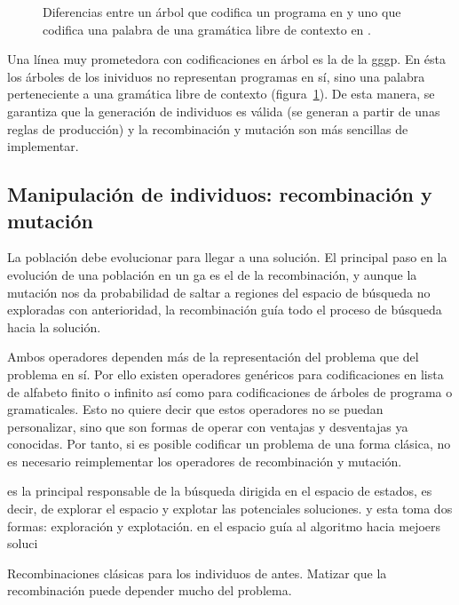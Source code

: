\begin{figure}
	\caption{Diferencias entre un árbol que codifica un programa en  y uno que codifica una palabra de una gramática libre de contexto en .}
	\label{fig:gp-vs-gggp}
\end{figure}

Una línea muy prometedora con codificaciones en árbol es la de la \gls{gggp}. En ésta los árboles de los inividuos no representan programas en sí, sino una palabra perteneciente a una gramática libre de contexto (figura~\ref{fig:gp-vs-gggp}). De esta manera, se garantiza que la generación de individuos es válida (se generan a partir de unas reglas de producción) y la recombinación y mutación son más sencillas de implementar.

\subsection{Manipulación de individuos: recombinación y mutación}

La población debe evolucionar para llegar a una solución. El principal paso en la evolución de una población en un \gls{ga} es el de la recombinación, y aunque la mutación nos da probabilidad de saltar a regiones del espacio de búsqueda no exploradas con anterioridad, la recombinación guía todo el proceso de búsqueda hacia la solución.

Ambos operadores dependen más de la representación del problema que del problema en sí. Por ello existen operadores genéricos para codificaciones en lista de alfabeto finito o infinito así como para codificaciones de árboles de programa o gramaticales. Esto no quiere decir que estos operadores no se puedan personalizar, sino que son formas de operar con ventajas y desventajas ya conocidas. Por tanto, si es posible codificar un problema de una forma clásica, no es necesario reimplementar los operadores de recombinación y mutación.

 es la principal responsable de la búsqueda dirigida en el espacio de estados, es decir, de explorar el espacio y explotar las potenciales soluciones. y esta toma dos formas: exploración y explotación. en el espacio guía al algoritmo hacia mejoers soluci

Recombinaciones clásicas para los individuos de antes. Matizar que la recombinación puede depender mucho del problema.


